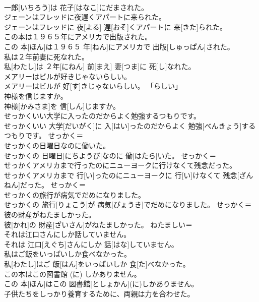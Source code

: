 \documentclass[8pt]{extreport}
\begin{document}
\begin{CJK}{UTF8}{min}
\\	一郎[いちろう]は 花子[はなこ]にだまされた。	
\\	ジェーンはフレッドに夜遅くアパートに来られた。	
\\	ジェーンはフレッドに 夜[よる] 遅[おそ]くアパートに 来[きた]られた。	
\\	この本は１９６５年にアメリカで出版された。	
\\	この 本[ほん]は１９６５ 年[ねん]にアメリカで 出版[しゅっぱん]された。	
\\	私は２年前妻に死なれた。	
\\	私[わたし]は ２年[にねん] 前[まえ] 妻[つま]に 死[し]なれた。	
\\	メアリーはビルが好きじゃないらしい。	
\\	メアリーはビルが 好[す]きじゃないらしい。	「らしい」
\\	神様を信じますか。	
\\	神様[かみさま]を 信[しん]じますか。	
\\	せっかくいい大学に入ったのだからよく勉強するつもりです。	
\\	せっかくいい 大学[だいがく]に 入[はい]ったのだからよく 勉強[べんきょう]するつもりです。	せっかく＝ 
\\	せっかくの日曜日なのに働いた。	
\\	せっかくの 日曜日[にちようび]なのに 働[はたら]いた。	せっかく＝ 
\\	せっかくアメリカまで行ったのにニューヨークに行けなくて残念だった。	
\\	せっかくアメリカまで 行[い]ったのにニューヨークに 行[い]けなくて 残念[ざんねん]だった。	せっかく＝ 
\\	せっかくの旅行が病気でだめになりました。	
\\	せっかくの 旅行[りょこう]が 病気[びょうき]でだめになりました。	せっかく＝ 
\\	彼の財産がねたましかった。	
\\	彼[かれ]の 財産[ざいさん]がねたましかった。	ねたましい＝ 
\\	それは江口さんにしか話していません。	
\\	それは 江口[えぐち]さんにしか 話[はな]していません。	
\\	私はご飯をいっぱいしか食べなかった。	
\\	私[わたし]はご 飯[はん]をいっぱいしか 食[た]べなかった。	
\\	この本はこの図書館 (に) しかありません。	
\\	この 本[ほん]はこの 図書館[としょかん](に)しかありません。	
\\	子供たちをしっかり養育するために、両親は力を合わせた。	

\end{CJK}
\end{document}
